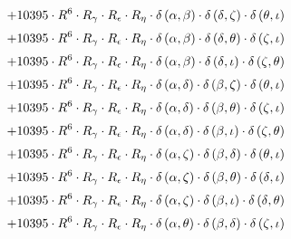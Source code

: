 \begin{subequations}
\begin{gather}
 \\[0.2em] \notag 		 + 10395 \cdot R^{6} \cdot R_{\gamma{}} \cdot R_{\epsilon{}} \cdot R_{\eta{}} \cdot \delta{}\left(\alpha{}, \beta{}\right) \cdot \delta{}\left(\delta{}, \zeta{}\right) \cdot \delta{}\left(\theta{}, \iota{}\right) 
 \\[0.2em] \notag 		 + 10395 \cdot R^{6} \cdot R_{\gamma{}} \cdot R_{\epsilon{}} \cdot R_{\eta{}} \cdot \delta{}\left(\alpha{}, \beta{}\right) \cdot \delta{}\left(\delta{}, \theta{}\right) \cdot \delta{}\left(\zeta{}, \iota{}\right) 
 \\[0.2em] \notag 		 + 10395 \cdot R^{6} \cdot R_{\gamma{}} \cdot R_{\epsilon{}} \cdot R_{\eta{}} \cdot \delta{}\left(\alpha{}, \beta{}\right) \cdot \delta{}\left(\delta{}, \iota{}\right) \cdot \delta{}\left(\zeta{}, \theta{}\right) 
 \\[0.2em] \notag 		 + 10395 \cdot R^{6} \cdot R_{\gamma{}} \cdot R_{\epsilon{}} \cdot R_{\eta{}} \cdot \delta{}\left(\alpha{}, \delta{}\right) \cdot \delta{}\left(\beta{}, \zeta{}\right) \cdot \delta{}\left(\theta{}, \iota{}\right) 
 \\[0.2em] \notag 		 + 10395 \cdot R^{6} \cdot R_{\gamma{}} \cdot R_{\epsilon{}} \cdot R_{\eta{}} \cdot \delta{}\left(\alpha{}, \delta{}\right) \cdot \delta{}\left(\beta{}, \theta{}\right) \cdot \delta{}\left(\zeta{}, \iota{}\right) 
 \\[0.2em] \notag 		 + 10395 \cdot R^{6} \cdot R_{\gamma{}} \cdot R_{\epsilon{}} \cdot R_{\eta{}} \cdot \delta{}\left(\alpha{}, \delta{}\right) \cdot \delta{}\left(\beta{}, \iota{}\right) \cdot \delta{}\left(\zeta{}, \theta{}\right) 
 \\[0.2em] \notag 		 + 10395 \cdot R^{6} \cdot R_{\gamma{}} \cdot R_{\epsilon{}} \cdot R_{\eta{}} \cdot \delta{}\left(\alpha{}, \zeta{}\right) \cdot \delta{}\left(\beta{}, \delta{}\right) \cdot \delta{}\left(\theta{}, \iota{}\right) 
 \\[0.2em] \notag 		 + 10395 \cdot R^{6} \cdot R_{\gamma{}} \cdot R_{\epsilon{}} \cdot R_{\eta{}} \cdot \delta{}\left(\alpha{}, \zeta{}\right) \cdot \delta{}\left(\beta{}, \theta{}\right) \cdot \delta{}\left(\delta{}, \iota{}\right) 
 \\[0.2em] \notag 		 + 10395 \cdot R^{6} \cdot R_{\gamma{}} \cdot R_{\epsilon{}} \cdot R_{\eta{}} \cdot \delta{}\left(\alpha{}, \zeta{}\right) \cdot \delta{}\left(\beta{}, \iota{}\right) \cdot \delta{}\left(\delta{}, \theta{}\right) 
 \\[0.2em] \notag 		 + 10395 \cdot R^{6} \cdot R_{\gamma{}} \cdot R_{\epsilon{}} \cdot R_{\eta{}} \cdot \delta{}\left(\alpha{}, \theta{}\right) \cdot \delta{}\left(\beta{}, \delta{}\right) \cdot \delta{}\left(\zeta{}, \iota{}\right) 

\end{gather}
\end{subequations}

